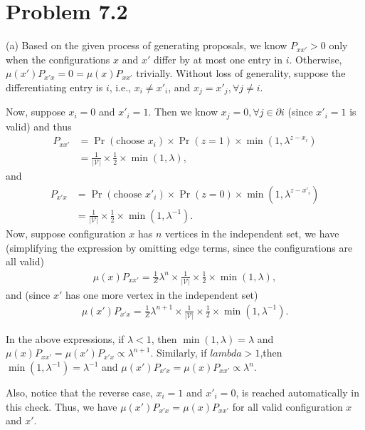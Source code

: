 \documentclass{article}
\newcommand{\qeds}{\hfill\qedsymbol}
\begin{document}
\pagebreak
\section*{Problem 7.2}
(a) 
%
Based on the given process of generating proposals, we know
$P_{xx'} > 0$ only when the configurations $x$ and $x'$ differ by at most one entry in $i$. Otherwise, $\mu(x')P_{x'x} = 0 = \mu(x)P_{xx'}$ trivially. Without loss of generality, suppose the differentiating entry is $i$, i.e., $x_i \neq x'_i$, and $x_j = x'_j, \forall j \neq i$.
%

Now, suppose $x_i = 0$ and $x'_i = 1$. Then we know $x_j=0, \forall j \in \partial i$ (since $x'_i = 1$ is valid) and thus
\begin{align*}
	P_{xx'} &= \Pr(\text{choose $x_i$}) \times \Pr(z = 1) \times \min(1, \lambda^{z - x_i})\\
	&= \frac{1}{|\mathscr{V}|}\times\frac{1}{2} \times \min(1, \lambda),
\end{align*}
and
\begin{align*}
	P_{x'x} &= \Pr(\text{choose $x'_i$}) \times \Pr(z = 0) \times \min(1, \lambda^{z - x'_i})\\ 
	&= \frac{1}{|\mathscr{V}|}\times \frac{1}{2} \times \min(1, \lambda^{-1}).
\end{align*}
%
Now, suppose configuration $x$ has $n$ vertices in the independent set, we have (simplifying the expression by omitting edge terms, since the configurations are all valid)
\begin{align*}
	\mu(x)P_{xx'} = \frac{1}{Z} \lambda^{n} \times \frac{1}{|\mathscr{V}|}\times\frac{1}{2} \times \min(1, \lambda),
\end{align*}
and (since $x'$ has one more vertex in the independent set)
\begin{align*}
	\mu(x')P_{x'x} = \frac{1}{Z} \lambda^{n+1} \times \frac{1}{|\mathscr{V}|}\times\frac{1}{2} \times \min(1, \lambda^{-1}).
\end{align*}

In the above expressions, if $\lambda < 1$, then $\min(1, \lambda) = \lambda$ and $\mu(x)P_{xx'} = \mu(x')P_{x'x}\propto\lambda^{n+1}$. Similarly, if $lambda > 1$,then  $\min(1, \lambda^{-1}) = \lambda^{-1}$ and $\mu(x')P_{x'x} = \mu(x)P_{xx'} \propto\lambda^{n}$.
%

Also, notice that the reverse case, $x_i = 1$ and $x'_i = 0$, is reached automatically in this check. Thus, we have $\mu(x')P_{x'x} = \mu(x)P_{xx'}$ for all valid configuration $x$ and $x'$. \qeds
\\
\end{document}
